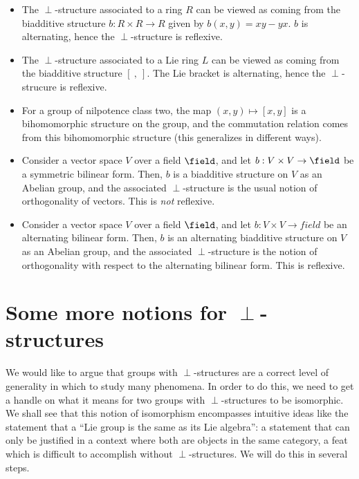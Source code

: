 \documentclass[a4paper]{amsart}
\begin{document}
\begin{itemize}

\item The $\perp$-structure associated to a ring $R$ can be viewed as
  coming from the biadditive structure $b: R \times R \to R$ given by
  $b(x,y) = xy - yx$. $b$ is alternating, hence the $\perp$-structure
  is reflexive.

\item The $\perp$-structure associated to a Lie ring $L$ can be viewed
  as coming from the biadditive structure $[ \ , \ ]$. The Lie bracket
  is alternating, hence the $\perp$-strucure is reflexive.

\item For a group of nilpotence class two, the map $(x,y) \mapsto
  [x,y]$ is a bihomomorphic structure on the group, and the
  commutation relation comes from this bihomomorphic structure (this
  generalizes in different ways).

\item Consider a vector space $V$ over a field $\field$, and let $b: V
  \times V \to \field$ be a symmetric bilinear form. Then, $b$ is a
  biadditive structure on $V$ as an Abelian group, and the associated
  $\perp$-structure is the usual notion of orthogonality of
  vectors. This is {\em not} reflexive.

\item Consider a vector space $V$ over a field $\field$, and let $b:V
  \times V \to field$ be an alternating bilinear form. Then, $b$ is an
  alternating biadditive structure on $V$ as an Abelian group, and the
  associated $\perp$-structure is the notion of orthogonality with
  respect to the alternating bilinear form. This is reflexive.

\end{itemize}

\section{Some more notions for $\perp$-structures}

We would like to argue that groups with $\perp$-structures are a
correct level of generality in which to study many phenomena. In order
to do this, we need to get a handle on what it means for two groups
with $\perp$-structures to be isomorphic. We shall see that this
notion of isomorphism encompasses intuitive ideas like the statement
that a ``Lie group is the same as its Lie algebra'': a statement that
can only be justified in a context where both are objects in the same
category, a feat which is difficult to accomplish without
$\perp$-structures. We will do this in several steps. 
\end{document}
